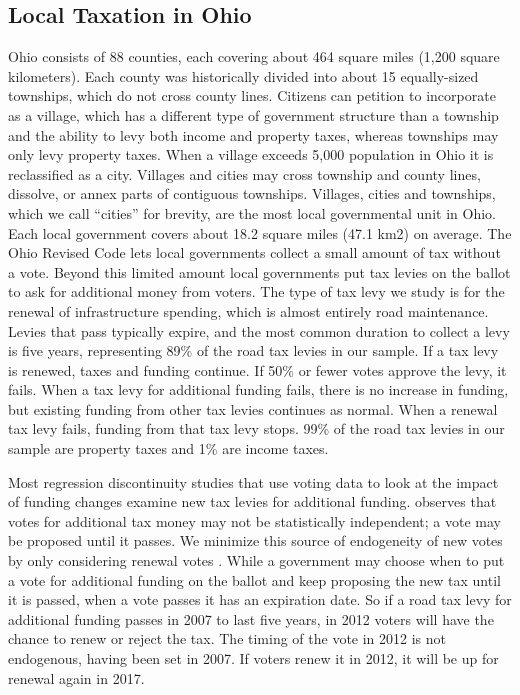 \subsection{Local Taxation in Ohio}

Ohio consists of 88 counties, each covering about 464 square miles (1,200 square kilometers).  Each county was historically divided into about 15 equally-sized townships, which do not cross county lines.  Citizens can petition to incorporate as a village, which has a different type of government structure than a township and the ability to levy both income and property taxes, whereas townships may only levy property taxes.  When a village exceeds 5,000 population in Ohio it is reclassified as a city.  Villages and cities may cross township and county lines, dissolve, or annex parts of contiguous townships.  Villages, cities and townships, which we call “cities” for brevity, are the most local governmental unit in Ohio. Each local government covers about 18.2 square miles (47.1 km2) on average. The Ohio Revised Code lets local governments collect a small amount of tax without a vote.  Beyond this limited amount local governments put tax levies on the ballot to ask for additional money from voters.  
The type of tax levy we study is for the renewal of infrastructure spending, which is almost entirely road maintenance.  Levies that pass typically expire, and the most common duration to collect a levy is five years, representing 89\% of the road tax levies in our sample.  If a tax levy is renewed, taxes and funding continue.  If 50\% or fewer votes approve the levy, it fails.  When a tax levy for additional funding fails, there is no increase in funding, but existing funding from other tax levies continues as normal.  When a renewal tax levy fails, funding from that tax levy stops.  99\% of the road tax levies in our sample are property taxes and 1\% are income taxes.

Most regression discontinuity studies that use voting data to look at the impact of funding changes examine new tax levies for additional funding.  \cite{cellini2010value} observes that votes for additional tax money may not be statistically independent; a vote may be proposed until it passes.  We minimize this source of endogeneity of new votes by only considering renewal votes \citep{brasington2017school}.  While a government may choose when to put a vote for additional funding on the ballot and keep proposing the new tax until it is passed, when a vote passes it has an expiration date.  So if a road tax levy for additional funding passes in 2007 to last five years, in 2012 voters will have the chance to renew or reject the tax.  The timing of the vote in 2012 is not endogenous, having been set in 2007.  If voters renew it in 2012, it will be up for renewal again in 2017. 


